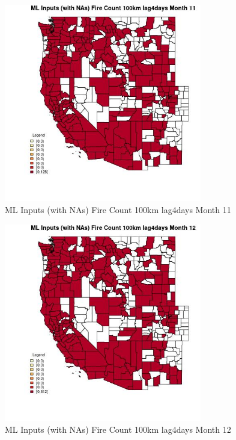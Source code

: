 \begin{figure} 
\centering  
\includegraphics[width=0.77\textwidth]{Code_Outputs/Report_ML_input_PM25_Step4_part_e_de_duplicated_aves_compiled_2019-05-21wNAs_CountyFire_Count_100km_lag4daysmedianMonth11.jpg} 
\caption{\label{fig:Report_ML_input_PM25_Step4_part_e_de_duplicated_aves_compiled_2019-05-21wNAsCountyFire_Count_100km_lag4daysmedianMonth11}ML Inputs (with NAs) Fire Count 100km lag4days Month 11} 
\end{figure} 
 

\begin{figure} 
\centering  
\includegraphics[width=0.77\textwidth]{Code_Outputs/Report_ML_input_PM25_Step4_part_e_de_duplicated_aves_compiled_2019-05-21wNAs_CountyFire_Count_100km_lag4daysmedianMonth12.jpg} 
\caption{\label{fig:Report_ML_input_PM25_Step4_part_e_de_duplicated_aves_compiled_2019-05-21wNAsCountyFire_Count_100km_lag4daysmedianMonth12}ML Inputs (with NAs) Fire Count 100km lag4days Month 12} 
\end{figure} 
 

